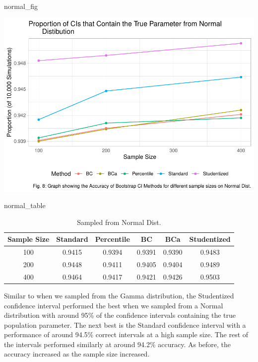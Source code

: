 \documentclass[12pt]{article}
\newenvironment{Shaded}{\begin{snugshade}}{\end{snugshade}}
\newcommand{\NormalTok}[1]{#1}
\begin{document}
\begin{Shaded}
\begin{Highlighting}[]
\NormalTok{normal\_fig}
\end{Highlighting}
\end{Shaded}

\includegraphics{paper_files/figure-latex/unnamed-chunk-23-1.pdf}

\begin{Shaded}
\begin{Highlighting}[]
\NormalTok{normal\_table}
\end{Highlighting}
\end{Shaded}

\begin{table}

\caption{\label{tab:create graphs}Sampled from Normal Dist.}
\centering
\begin{tabular}[t]{cccccc}
\toprule
Sample Size & Standard & Percentile & BC & BCa & Studentized\\
\midrule
100 & 0.9415 & 0.9394 & 0.9391 & 0.9390 & 0.9483\\
200 & 0.9448 & 0.9411 & 0.9405 & 0.9404 & 0.9489\\
400 & 0.9464 & 0.9417 & 0.9421 & 0.9426 & 0.9503\\
\bottomrule
\end{tabular}
\end{table}

Similar to when we sampled from the Gamma distribution, the Studentized
confidence interval performed the best when we sampled from a Normal
distribution with around 95\% of the confidence intervals containing the
true population parameter. The next best is the Standard confidence
interval with a performance of around 94.5\% correct intervals at a high
sample size. The rest of the intervals performed similarly at around
94.2\% accuracy. As before, the accuracy increased as the sample size
increased.



\end{document}
